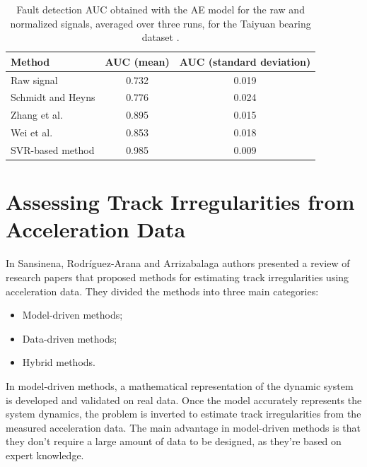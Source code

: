 \begin{table}[H]
    \centering
    \begin{tabular}{lcc}
        \hline
        Method & AUC (mean) & AUC (standard deviation) \\
        \hline
        Raw signal & 0.732 & 0.019 \\
        Schmidt and Heyns & 0.776 & 0.024 \\
        Zhang et al. & 0.895 & 0.015 \\
        Wei et al. & 0.853 & 0.018 \\
        SVR-based method & 0.985 & 0.009 \\
        \hline
    \end{tabular}
    \caption{Fault detection AUC obtained with the AE model for the raw and normalized signals, averaged over three runs, for the Taiyuan bearing dataset \cite{FANG2025}.}
    \label{tab:Fang-Results}
\end{table}


\section{Assessing Track Irregularities from Acceleration Data} \label{sec-track-quality-accel}

In Sansinena, Rodríguez-Arana and Arrizabalaga \cite{Sansinena26032025} authors presented a review of research papers that proposed methods for estimating track irregularities using acceleration data. They divided the methods into three main categories:
\begin{itemize}
    \item Model-driven methods;
    \item Data-driven methods;
    \item Hybrid methods.
\end{itemize}

In model-driven methods, a mathematical representation of the dynamic system is developed and validated on real data. Once the model accurately represents the system dynamics, the problem is inverted to estimate track irregularities from the measured acceleration data. The main advantage in model-driven methods is that they don't require a large amount of data to be designed, as they're based on expert knowledge. 

